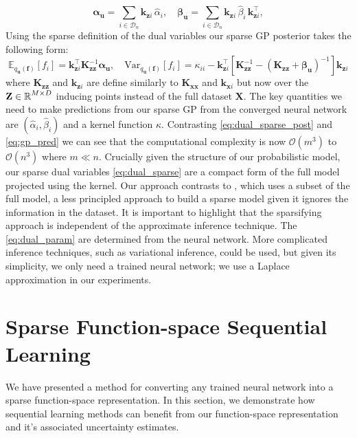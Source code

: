 \documentclass{article}
\newcommand{\mathbold}[1]{\bm{#1}}
\newcommand{\mbf}[1]{\mathbf{#1}}
\newcommand{\MZ}{\mbf{Z}}
\newcommand{\MX}{\mbf{X}}
\newcommand{\T}{\top}
\newcommand{\valpha}[0]{\mathbold{\alpha}}
\newcommand{\vbeta}[0]{\mathbold{\beta}}
\newcommand{\vf}{\mbf{f}}
\newcommand{\vu}{\mbf{u}}
\newcommand{\vx}{\mbf{x}}
\newcommand{\MKzz}{\mbf{K}_{\mbf{z}\mbf{z}}}
\newcommand{\MKxx}{\mbf{K}_{\mbf{x}\mbf{x}}}
\newcommand{\vkzi}{\mbf{k}_{\mbf{z}i}}
\newcommand{\vkzs}{\mbf{k}_{\mbf{z}i}}
\newcommand{\vk}{\mbf{k}}
\newcommand{\myexpect}{\mathbb{E}}
\begin{document}
\begin{equation} 
	\valpha_{\vu}  =  \sum_{i \in \mathcal{D}_{n}}  \vkzi \, \hat{\alpha}_{i}, \quad
	\vbeta_{\vu} =  \sum_{i \in \mathcal{D}_{n}} \vkzi \,\hat{\beta}_{i} \, \vkzi^{\T} ,    
\label{eq:dual_sparse}
\end{equation}
Using the sparse definition of the dual variables our sparse GP posterior takes the following form:
\begin{equation}\label{eq:dual_sparse_post}
   \myexpect_{q_{\vu}(\vf)}[f_i] = \vkzs^{\T} \MKzz^{-1}   \valpha_{\vu} , \quad 
   \textrm{Var}_{q_{\vu}(\vf)}[f_i]  = \kappa_{ii} - \vkzs^\top [\MKzz^{-1} - (\MKzz + \vbeta_{\vu})^{-1} ]\vkzs
\end{equation}
where $\MKzz$ and $\vkzs$ are define similarly to $\MKxx$ and $\vk_{\vx i}$ but now over the $\MZ \in \R^{M \times D} $ inducing points instead of the full dataset $\MX$. The key quantities we need to make predictions from our sparse GP from the converged neural network are $(\hat{\alpha}_i, \hat{\beta}_i)$ and a kernel function $\kappa$. Contrasting \cref{eq:dual_sparse_post} and \cref{eq:gp_pred} we can see that the computational complexity is now $\mathcal{O}(m^3)$ to $\mathcal{O}(n^3)$ where $m \ll n$.  Crucially given the structure of our probabilistic model, our sparse dual variables \cref{eq:dual_sparse} are a compact form of the full model projected using the kernel. Our approach contrasts to \citet{immerImprovingPredictionsBayesian2021}, which uses a subset of the full model, a less principled approach to build a sparse model given it ignores the information in the dataset. It is important to highlight that the sparsifying approach is independent of the approximate inference technique. The \cref{eq:dual_param} are determined from the neural network. More complicated inference techniques, such as variational inference, could be used, but given its simplicity, we only need a trained neural network; we use a Laplace approximation in our experiments.




\section{Sparse Function-space Sequential Learning}

We have presented a method for converting any trained neural network into a sparse function-space representation.
In this section, we demonstrate how sequential learning methods can benefit from our function-space representation and it's associated uncertainty estimates.
\end{document}

